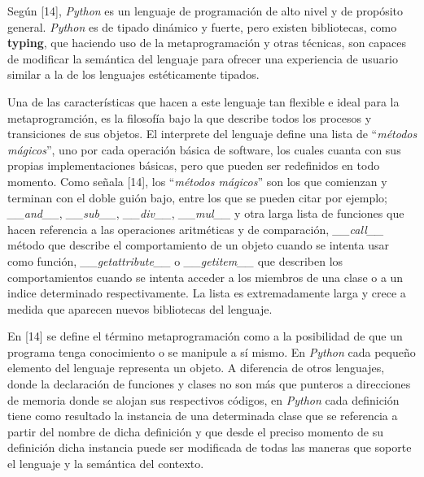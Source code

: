 Según [14], {\it Python} es un lenguaje de programación de alto nivel y de propósito general.
    {\it Python} es de tipado dinámico y fuerte, pero existen bibliotecas, como {\bf typing}, que haciendo
uso de la metaprogramación y otras técnicas, son capaces de modificar la semántica del
lenguaje para ofrecer una experiencia de usuario similar a la de los lenguajes estéticamente
tipados.

Una de las características que hacen a este lenguaje tan flexible e ideal para la metaprogramción,
es la filosofía bajo la que describe todos los procesos y transiciones de sus objetos. El
interprete del lenguaje define una lista de ``{\it métodos mágicos}'', uno por cada operación básica
de software, los cuales cuanta con sus propias implementaciones básicas, pero que pueden ser
redefinidos en todo momento. Como señala [14], los ``{\it métodos mágicos}'' son los que comienzan y
terminan con el doble guión bajo, entre los que se pueden citar por ejemplo;
{\it \_\_and\_\_}, {\it \_\_sub\_\_}, {\it \_\_div\_\_}, {\it \_\_mul\_\_} y otra larga lista de funciones que hacen referencia
a las operaciones aritméticas y de comparación, {\it\_\_call\_\_} método que describe el comportamiento
de un objeto cuando se intenta usar como función, {\it \_\_getattribute\_\_} o {\it \_\_getitem\_\_}
que describen los comportamientos cuando se intenta acceder a los miembros de una clase o a
un indice determinado respectivamente. La lista es extremadamente larga y crece a medida
que aparecen nuevos bibliotecas del lenguaje.

En [14] se define el término metaprogramación como a la posibilidad de que un programa tenga
conocimiento o se manipule a sí mismo. En {\it Python} cada pequeño elemento del lenguaje
representa un objeto. A diferencia de otros lenguajes, donde la declaración de funciones y
clases no son más que punteros a direcciones de memoria donde se alojan sus respectivos códigos,
en {\it Python} cada definición tiene como resultado la instancia de una determinada clase que se
referencia a partir del nombre de dicha definición y que desde el preciso momento de su
definición dicha instancia puede ser modificada de todas las maneras que soporte el lenguaje
y la semántica del contexto.

